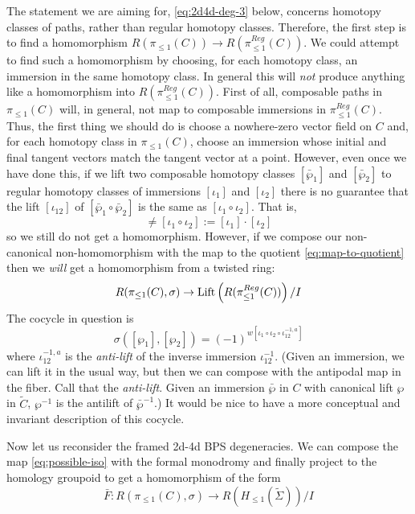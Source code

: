 \documentclass[11pt,a4paper]{article}
\begin{document}
The statement we are aiming for, \eqref{eq:2d4d-deg-3} below,
concerns homotopy classes of paths, rather than regular homotopy classes. Therefore,
the first step is to find a homomorphism $R(\pi_{\leq 1}(C)) \to R(\pi^{Reg}_{\leq 1}(C))$.
We could attempt to find such a homomorphism
by choosing, for each homotopy class, an immersion in the same homotopy
class. In general this will \emph{not} produce anything like a homomorphism
into $ R(\pi^{Reg}_{\leq 1}(C))$. First of all, composable paths in
$\pi_{\leq 1}(C)$ will, in general, not map to composable immersions in
$\pi^{Reg}_{\leq 1}(C)$. Thus, the first thing we should do is choose a
nowhere-zero vector field on $C$ and, for each homotopy class in $\pi_{\leq 1}(C)$,
choose an immersion whose initial and final tangent vectors match the
tangent vector at a point.  However, even once we have done this, if we
lift two composable homotopy classes $[\bar\wp_1]$ and $ [\bar \wp_2]$
to regular homotopy classes of immersions $[\iota_1]$ and $[\iota_2]$
there is no guarantee that the lift $[\iota_{12}]$ of
$[\bar\wp_1 \circ \bar \wp_2]$ is the same as $[\iota_1 \circ \iota_2]$.
That is,
 \begin{equation}
 [\iota_{12}] \not= [\iota_1\circ \iota_2] := [\iota_1]\cdot [\iota_2]
 \end{equation}
so we still do not get a homomorphism.
However, if we compose our
non-canonical non-homomorphism  with the map to the
quotient \eqref{eq:map-to-quotient} then we \emph{will} get a homomorphism
from a twisted ring:
\begin{equation}\label{eq:possible-iso}
R(\pi_{\leq 1}(C),\sigma) \to  {\rm Lift}\left( R(\pi^{Reg}_{\leq 1}(C)) \right)/I
\end{equation}
The cocycle in question is
\begin{equation}\label{eq:immersion-cocycle}
\sigma([\wp_1],[\wp_2]) = (-1)^{w[\iota_1\circ \iota_2\circ \iota_{12}^{-1,a}]}
\end{equation}
where $\iota_{12}^{-1,a}$ is the \emph{anti-lift} of the inverse immersion
$\iota_{12}^{-1}$. (Given an immersion,  we can lift it in the usual way, but then we can compose with the antipodal
map in the fiber. Call that the \emph{anti-lift}.
Given an immersion $\bar \wp$ in $C$ with canonical lift $\wp$ in $\tilde C$,
$\wp^{-1}$ is the antilift of $\bar\wp^{-1}$.) It would be nice to
have a more conceptual and invariant description of this cocycle.

Now let us reconsider the framed 2d-4d BPS degeneracies. We can
compose the map \eqref{eq:possible-iso} with the formal monodromy
and finally project to the homology groupoid to get a homomorphism of the form
\begin{equation}\label{eq:2d4d-deg-1}
\bar F: R(\pi_{\leq 1}(C),\sigma) \to R(H_{\leq 1}(\tilde \Sigma))/I
\end{equation}
\end{document}
